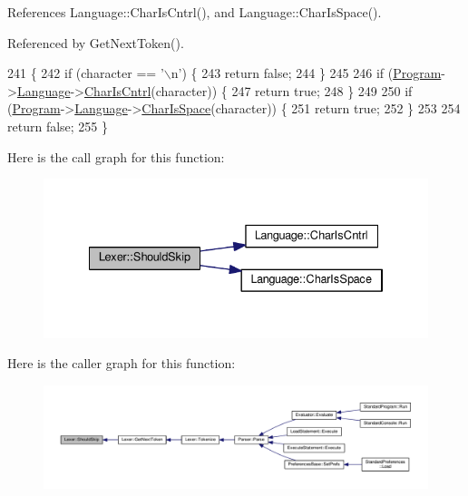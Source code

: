 References Language\+::\+Char\+Is\+Cntrl(), and Language\+::\+Char\+Is\+Space().



Referenced by Get\+Next\+Token().


\begin{DoxyCode}
241 \{
242     \textcolor{keywordflow}{if} (character == \textcolor{charliteral}{'\(\backslash\)n'}) \{
243         \textcolor{keywordflow}{return} \textcolor{keyword}{false};
244     \}
245 
246     \textcolor{keywordflow}{if} (\hyperlink{classProgram}{Program}->\hyperlink{classProgram_a7c82b4c429bbee984b8bb287b9e137f7}{Language}->\hyperlink{classLanguage_a392214aa8de840d1cf7b738945ce1799}{CharIsCntrl}(character)) \{
247         \textcolor{keywordflow}{return} \textcolor{keyword}{true};
248     \}
249 
250     \textcolor{keywordflow}{if} (\hyperlink{classProgram}{Program}->\hyperlink{classProgram_a7c82b4c429bbee984b8bb287b9e137f7}{Language}->\hyperlink{classLanguage_a1470832710ca9c4e4695bb442759c0a7}{CharIsSpace}(character)) \{
251         \textcolor{keywordflow}{return} \textcolor{keyword}{true};
252     \}
253 
254     \textcolor{keywordflow}{return} \textcolor{keyword}{false};
255 \}
\end{DoxyCode}


Here is the call graph for this function\+:
\nopagebreak
\begin{figure}[H]
\begin{center}
\leavevmode
\includegraphics[width=334pt]{d6/dc0/classLexer_a864c73023ef6b437a8d58c8158fbc6be_cgraph}
\end{center}
\end{figure}




Here is the caller graph for this function\+:
\nopagebreak
\begin{figure}[H]
\begin{center}
\leavevmode
\includegraphics[width=350pt]{d6/dc0/classLexer_a864c73023ef6b437a8d58c8158fbc6be_icgraph}
\end{center}
\end{figure}


